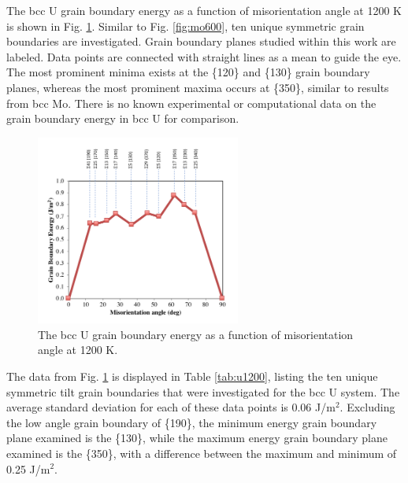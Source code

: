 \documentclass[review]{elsarticle}
\begin{document}
The bcc U grain boundary energy as a function of misorientation angle at 1200 K is shown in Fig. \ref{fig:u1200}. Similar to Fig. \ref{fig:mo600}, ten unique symmetric grain boundaries are investigated. Grain boundary planes studied within this work are labeled. Data points are connected with straight lines as a mean to guide the eye. The most prominent minima exists at the \{120\} and \{130\} grain boundary planes, whereas the most prominent maxima occurs at \{350\}, similar to results from bcc Mo. There is no known experimental or computational data on the grain boundary energy in bcc U for comparison.

\begin{figure}[h]
 \centering
 \includegraphics[width=0.6\textwidth]{u1200B.png} 
 \caption{The bcc U grain boundary energy as a function of misorientation angle at 1200 K.}
 \label{fig:u1200}
\end{figure}

The data from Fig. \ref{fig:u1200} is displayed in Table \ref{tab:u1200}, listing the ten unique symmetric tilt grain boundaries that were investigated for the bcc U system. The average standard deviation for each of these data points is 0.06 J/m$^{2}$. Excluding the low angle grain boundary of \{190\}, the minimum energy grain boundary plane examined is the \{130\}, while the maximum energy grain boundary plane examined is the \{350\}, with a difference between the maximum and minimum of 0.25 J/m$^{2}$. 
\end{document}
